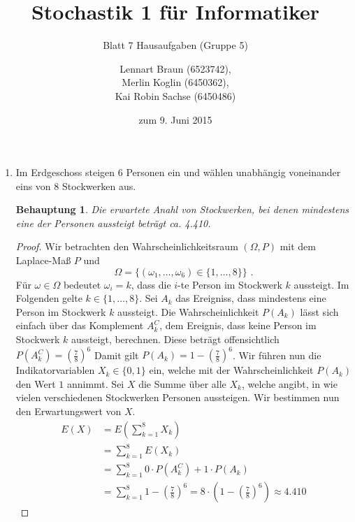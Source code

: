 \documentclass[a4paper]{scrartcl}
\title{Stochastik 1 für Informatiker}
\subtitle{Blatt 7 Hausaufgaben (Gruppe 5)}
\author{
    Lennart Braun (6523742), \\
    Merlin Koglin (6450362), \\
    Kai Robin Sachse (6450486)
}
\date{zum 9. Juni 2015}
\newtheorem*{behaupt}{Behauptung}
\begin{document}
\maketitle

\begin{enumerate}[label=\bfseries\arabic*.]
    \item
        Im Erdgeschoss steigen 6 Personen ein und wählen unabhängig voneinander
        eins von 8 Stockwerken aus.
        \begin{behaupt}
            Die erwartete Anahl von Stockwerken, bei denen mindestens eine der
            Personen aussteigt beträgt ca. \num{4,410}.
        \end{behaupt}
        \begin{proof}
            Wir betrachten den Wahrscheinlichkeitsraum $(\Omega, P)$ mit dem
            Laplace-Maß $P$ und
            \begin{equation*}
                \Omega = \Big\{ (\omega_1, \ldots, \omega_6)
                                \in \{1, \ldots, 8\} \Big\}
                \text{ .}
            \end{equation*}
            Für $\omega \in \Omega$ bedeutet $\omega_i = k$, dass die $i$-te Person
            im Stockwerk $k$ aussteigt.
            Im Folgenden gelte $k \in \{1, \ldots, 8\}$.
            Sei $A_k$ das Ereigniss, dass mindestens eine Person im Stockwerk
            $k$ aussteigt.
            Die Wahrscheinlichkeit $P(A_k)$ lässt sich einfach über das
            Komplement $A_k^C$, dem Ereignis, dass keine Person im Stockwerk $k$
            aussteigt, berechnen.
            Diese beträgt offensichtlich $P(A_k^C) = \left(\frac{7}{8}\right)^6$
            Damit gilt $P(A_k) = 1 - \left( \frac{7}{8} \right)^6$.
            Wir führen nun die Indikatorvariablen $X_k \in \{0, 1\}$ ein, welche
            mit der Wahrscheinlichkeit $P(A_k)$ den Wert $1$ annimmt.
            Sei $X$ die Summe über alle $X_k$, welche angibt, in wie vielen
            verschiedenen Stockwerken Personen aussteigen.
            Wir bestimmen nun den Erwartungswert von $X$.
            \begin{equation*}
                \begin{split}
                    E(X) &= E \left( \sum_{k = 1}^8 X_k \right) \\
                         &= \sum_{k = 1}^8 E(X_k) \\
                         &= \sum_{k = 1}^8 0 \cdot P(A_k^C) + 1 \cdot P(A_k) \\
                         &= \sum_{k = 1}^8 1 - \left( \frac{7}{8} \right)^6  
                         = 8 \cdot
                            \left( 1 - \left( \frac{7}{8} \right)^6 \right)  
                         \approx \num{4,410}
                \end{split}
            \end{equation*}
        \end{proof}


\end{enumerate}
\end{document}
